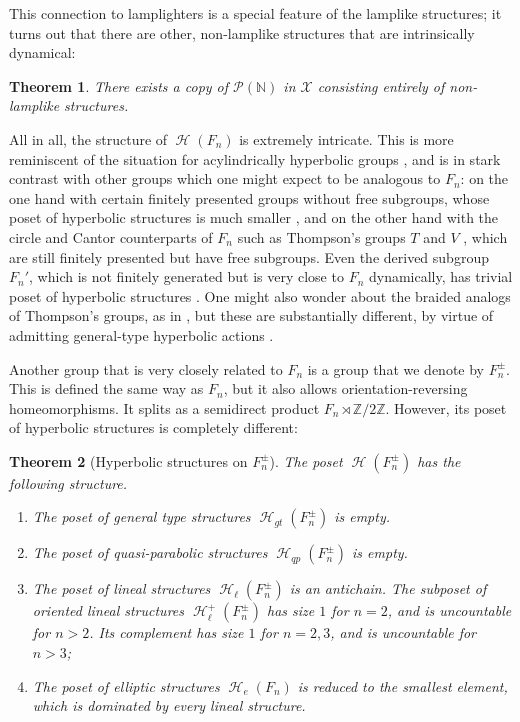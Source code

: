 \documentclass[reqno,12pt]{amsart}\setcounter{tocdepth}{1}
\newtheorem{thmA}{Theorem}
\theoremstyle{definition}
\newcommand{\N}{\mathbb{N}}
\newcommand{\Z}{\mathbb{Z}}
\DeclareMathOperator{\Hyp}{\mathcal{H}}
\newcommand{\X}{\mathcal{X}}
\numberwithin{equation}{section}
\begin{document}
\medskip

This connection to lamplighters is a special feature of the lamplike structures; it turns out that there are other, non-lamplike structures that are intrinsically dynamical:

\begin{thmA}%
\label{intro:thm:non_lamp}
There exists a copy of $\mathcal{P}(\N)$ in $\X$ consisting entirely of non-lamplike structures.
\end{thmA}

\medskip

All in all, the structure of $\Hyp(F_n)$ is extremely intricate. This is more reminiscent of the situation for acylindrically hyperbolic groups \cite{ABO}, and is in stark contrast with other groups which one might expect to be analogous to $F_n$: on the one hand with certain finitely presented groups without free subgroups, whose poset of hyperbolic structures is much smaller \cite{sahana:wreath, AR:BS, confining, ABR2}, and on the other hand with the circle and Cantor counterparts of $F_n$ such as Thompson's groups $T$ and $V$ \cite{NL}, which are still finitely presented but have free subgroups.
Even the derived subgroup $F_n'$, which is not finitely generated but is very close to $F_n$ dynamically, has trivial poset of hyperbolic structures \cite{NL}. One might also wonder about the braided analogs of Thompson's groups, as in \cite{brin07,dehornoy06,brady08}, but these are substantially different, by virtue of admitting general-type hyperbolic actions \cite{fff_lodha_zar}.

\medskip

Another group that is very closely related to $F_n$ is a group that we denote by $F_n^{\pm}$. This is defined the same way as $F_n$, but it also allows orientation-reversing homeomorphisms. It splits as a semidirect product $F_n \rtimes \Z/2\Z$. However, its poset of hyperbolic structures is completely different:

\begin{thmA}[Hyperbolic structures on $F_n^{\pm}$]
\label{intro:thm:reverse}
The poset $\Hyp(F_n^{\pm})$ has the following structure.
\begin{enumerate}
   \item The poset of general type structures $\Hyp_{gt}(F_n^{\pm})$ is empty.
   \item The poset of quasi-parabolic structures $\Hyp_{qp}(F_n^{\pm})$ is empty.
   \item The poset of lineal structures $\Hyp_{\ell}(F_n^{\pm})$ is an antichain. The subposet of oriented lineal structures $\Hyp_{\ell}^+(F_n^{\pm})$ has size $1$ for $n = 2$, and is uncountable for $n > 2$. Its complement has size $1$ for $n = 2,3$, and is uncountable for $n > 3$;
   \item The poset of elliptic structures $\Hyp_e(F_n)$ is reduced to the smallest element, which is dominated by every lineal structure.
\end{enumerate}
\end{thmA}
\end{document}
